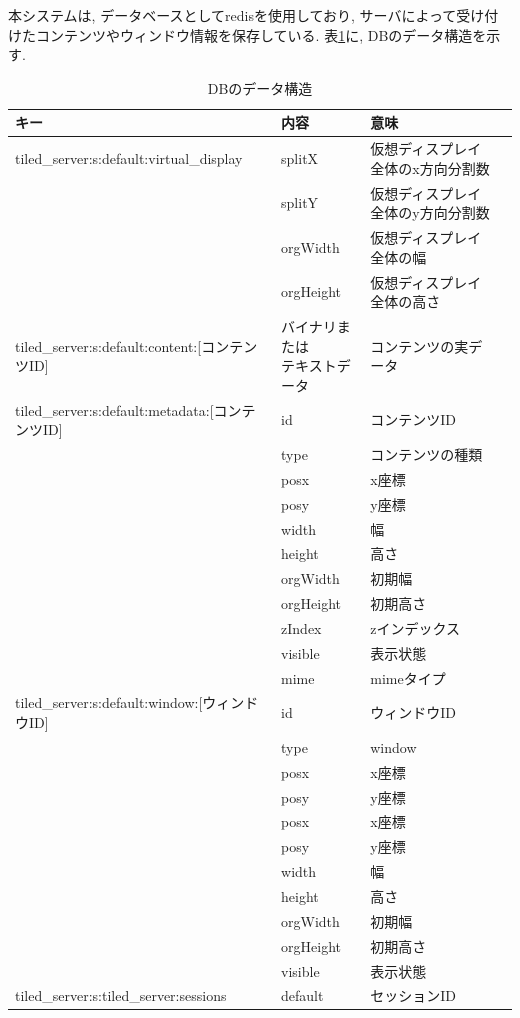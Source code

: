 \documentclass[a4paper,10pt,oneside]{jsbook}
\begin{document}
本システムは, データベースとしてredisを使用しており, サーバによって受け付けたコンテンツやウィンドウ情報を保存している. 表\ref{dbstructure}に, DBのデータ構造を示す.
\begin{table}[htbp]
\begin{center}
\caption{DBのデータ構造}
\label{dbstructure}
\begin{tabular}{|l|l|l|l|}
\hline
キー	& 内容 & 意味 \\
\hline
\hline
tiled\_server:s:default:virtual\_display & splitX & 仮想ディスプレイ全体のx方向分割数 \\
　	& splitY	 &仮想ディスプレイ全体のy方向分割数 \\
　	& orgWidth & 仮想ディスプレイ全体の幅 \\
　	& orgHeight & 仮想ディスプレイ全体の高さ \\
\hline
tiled\_server:s:default:content:[コンテンツID] & \shortstack[l]{バイナリまたは\\テキストデータ}	& コンテンツの実データ \\
\hline
tiled\_server:s:default:metadata:[コンテンツID] & id & コンテンツID \\
　	& type & コンテンツの種類 \\
　	& posx & x座標 \\
　	& posy & y座標 \\
　	& width & 幅 \\
　	& height & 高さ \\
　	& orgWidth &初期幅 \\
　	& orgHeight & 初期高さ \\
　	& zIndex & zインデックス \\
　	& visible & 表示状態 \\
　	& mime & 	mimeタイプ \\
\hline
tiled\_server:s:default:window:[ウィンドウID] & id & ウィンドウID \\
　	& type & window \\
　	& posx &  x座標 \\
　	& posy & 	y座標 \\
　	& posx & 	x座標 \\
　	& posy & 	y座標 \\
　	& width & 	幅 \\
　	& height & 	高さ \\
　	& orgWidth & 	初期幅 \\
　	& orgHeight & 	初期高さ \\
　	& visible & 	表示状態 \\
\hline
tiled\_server:s:tiled\_server:sessions & default & セッションID \\
\hline

\end{tabular}
\end{center}
\end{table}
\end{document}

